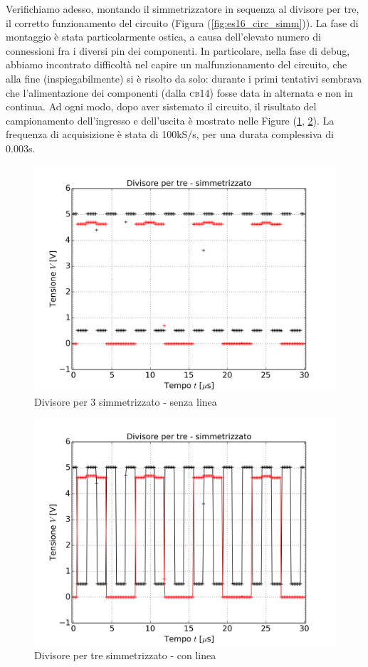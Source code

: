 \documentclass[journal, a4paper]{IEEEtran}
\begin{document}
Verifichiamo adesso, montando il simmetrizzatore in sequenza al divisore per tre, il corretto funzionamento del circuito (Figura (\ref{fig:es16_circ_simm})). La fase di montaggio è stata particolarmente ostica, a causa dell'elevato numero di connessioni fra i diversi pin dei componenti. In particolare, nella fase di debug, abbiamo incontrato difficoltà nel capire un malfunzionamento del circuito, che alla fine (inspiegabilmente) si è risolto da solo: durante i primi tentativi sembrava che l'alimentazione dei componenti (dalla \textsc{cb14}) fosse data in alternata e non in continua. Ad ogni modo, dopo aver sistemato il circuito, il risultato del campionamento dell'ingresso e dell'uscita è mostrato nelle Figure (\ref{fig:es16_senzaline}, \ref{fig:es16_conline}). La frequenza di acquisizione è stata di 100kS/s, per una durata complessiva di 0.003s.

\begin{figure}
\centering
\includegraphics[width=0.9\linewidth]{./es16_senzaline}
\caption{Divisore per 3 simmetrizzato - senza linea}
\label{fig:es16_senzaline}
\end{figure}


\begin{figure}
\centering
\includegraphics[width=0.9\linewidth]{./es16_conline}
\caption{Divisore per tre simmetrizzato - con linea}
\label{fig:es16_conline}
\end{figure}
\end{document}

